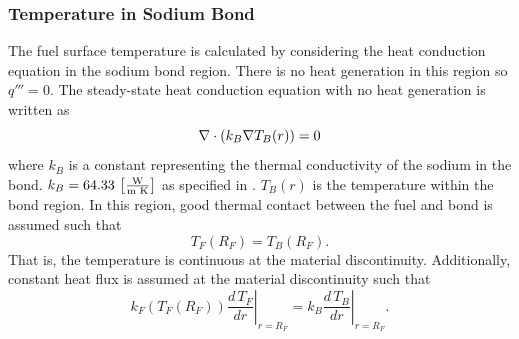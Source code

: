     \subsubsection{Temperature in Sodium Bond}
      The fuel surface temperature is calculated by considering the heat
      conduction equation in the sodium bond region. There is no heat generation
      in this region so $q'''=0$.
      The steady-state heat conduction equation with no heat generation is
      written as
      \begin{equation}
        \label{eq:tc_grad}
        \mathbf{\nabla} \cdot (k_B \mathbf{\nabla} T_B(r)) = 0
      \end{equation}
      where $k_B$ is a constant representing the thermal conductivity of the
      sodium in the bond. $k_B = 64.33 \,\left[\text{{$\frac{\text{W}}{\text{m K}}$}}\right]$ as
      specified in .
      $T_B(r)$ is the temperature within the bond region.
      In this region, good thermal contact between the fuel and bond is
      assumed such that
      \begin{equation}
        \label{eq:rf_temp_continuity}
        T_F(R_F)=T_B(R_F).
      \end{equation}
      That is, the temperature is 
      continuous at the material discontinuity. Additionally, constant heat flux
      is assumed at the material discontinuity such that
      \begin{equation}
        \label{eq:rf_flux_continuity}
        k_F(T_F(R_F)) \left.\frac{d\,T_F}{dr}\right|_{r=R_F} = 
          k_B \left.\frac{d\,T_B}{dr}\right|_{r=R_F}.
      \end{equation}

